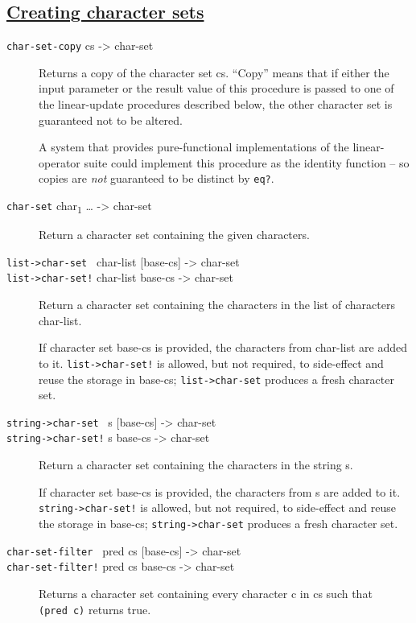 \subsection{\texorpdfstring{\href{}{Creating character
sets}}{Creating character sets}}\label{creating-character-sets}

\begin{description}
\item[ \href{}{} \texttt{char-set-copy} cs -\textgreater{} char-set ]
Returns a copy of the character set cs. ``Copy'' means that if either
the input parameter or the result value of this procedure is passed to
one of the linear-update procedures described below, the other character
set is guaranteed not to be altered.

A system that provides pure-functional implementations of the
linear-operator suite could implement this procedure as the identity
function -- so copies are \emph{not} guaranteed to be distinct by
\texttt{eq?}.
\item[ \href{}{} \texttt{char-set} char\textsubscript{1} \ldots{}
-\textgreater{} char-set ]
Return a character set containing the given characters.
\item[ \href{}{} \href{}{} \texttt{list-\textgreater{}char-set~}
char-list {[}base-cs{]} -\textgreater{} char-set\\
\texttt{list-\textgreater{}char-set!} char-list base-cs -\textgreater{}
char-set ]
Return a character set containing the characters in the list of
characters char-list.

If character set base-cs is provided, the characters from char-list are
added to it. \texttt{list-\textgreater{}char-set!} is allowed, but not
required, to side-effect and reuse the storage in base-cs;
\texttt{list-\textgreater{}char-set} produces a fresh character set.
\item[ \href{}{} \href{}{} \texttt{string-\textgreater{}char-set~} s
{[}base-cs{]} -\textgreater{} char-set\\
\texttt{string-\textgreater{}char-set!} s base-cs -\textgreater{}
char-set ]
Return a character set containing the characters in the string s.

If character set base-cs is provided, the characters from s are added to
it. \texttt{string-\textgreater{}char-set!} is allowed, but not
required, to side-effect and reuse the storage in base-cs;
\texttt{string-\textgreater{}char-set} produces a fresh character set.
\item[ \href{}{} \href{}{} \texttt{char-set-filter~} pred cs
{[}base-cs{]} -\textgreater{} char-set\\
\texttt{char-set-filter!} pred cs base-cs -\textgreater{} char-set ]
Returns a character set containing every character c in cs such that
\texttt{(pred\ c)} returns true.


\end{description}

